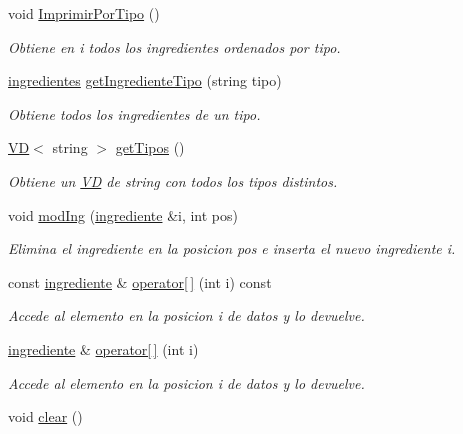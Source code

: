 \begin{DoxyCompactItemize}
void \hyperlink{classingredientes_ada1c7580434d7802ee1e87196d15524b}{Imprimir\+Por\+Tipo} ()
\begin{DoxyCompactList}\small\item\em Obtiene en i todos los ingredientes ordenados por tipo. \end{DoxyCompactList}\item 
\hyperlink{classingredientes}{ingredientes} \hyperlink{classingredientes_a160ecb07facb16cbe7369ea797c67549}{get\+Ingrediente\+Tipo} (string tipo)
\begin{DoxyCompactList}\small\item\em Obtiene todos los ingredientes de un tipo. \end{DoxyCompactList}\item 
\hyperlink{classVD}{VD}$<$ string $>$ \hyperlink{classingredientes_a0404324a62539f06a97498169b879005}{get\+Tipos} ()
\begin{DoxyCompactList}\small\item\em Obtiene un \hyperlink{classVD}{VD} de string con todos los tipos distintos. \end{DoxyCompactList}\item 
void \hyperlink{classingredientes_a936869362643db1949a326167c668270}{mod\+Ing} (\hyperlink{classingrediente}{ingrediente} \&i, int pos)
\begin{DoxyCompactList}\small\item\em Elimina el ingrediente en la posicion pos e inserta el nuevo ingrediente i. \end{DoxyCompactList}\item 
const \hyperlink{classingrediente}{ingrediente} \& \hyperlink{classingredientes_afc77feaa95ef6885c9f4e0bbeef746a4}{operator\mbox{[}$\,$\mbox{]}} (int i) const
\begin{DoxyCompactList}\small\item\em Accede al elemento en la posicion i de datos y lo devuelve. \end{DoxyCompactList}\item 
\hyperlink{classingrediente}{ingrediente} \& \hyperlink{classingredientes_aec207846725fd56da917fc87538e2609}{operator\mbox{[}$\,$\mbox{]}} (int i)
\begin{DoxyCompactList}\small\item\em Accede al elemento en la posicion i de datos y lo devuelve. \end{DoxyCompactList}\item 
void \hyperlink{classingredientes_ac7cc4f90c19935063ba0401f9aab1394}{clear} ()

\end{DoxyCompactItemize}
